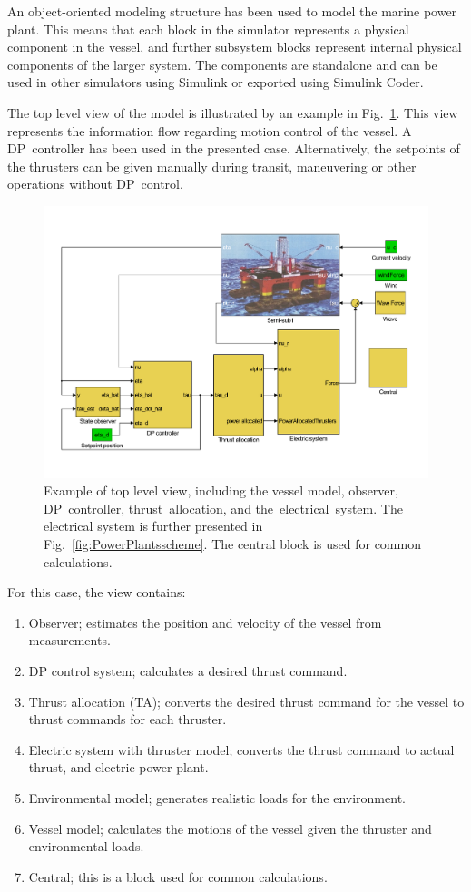 \documentclass[journal]{IEEEtran}
\begin{document}
An object-oriented modeling structure has been used to model the marine power plant.
This means that each block in the simulator represents a physical component in the vessel, and further subsystem blocks represent internal physical components of the larger system.
The components are standalone and can be used in other simulators using Simulink or exported using Simulink Coder.

The top level view of the model is illustrated by an example in Fig.~\ref{fig:DPscheme}.
This view represents the information flow regarding motion control of the vessel.
A DP~controller has been used in the presented case.
Alternatively, the setpoints of the thrusters can be given manually during transit, maneuvering or other operations without DP~control.
\begin{figure}[t!]
\normalsize
\centering
\includegraphics[trim=30 60 30 60,width=.7\textwidth,clip]{./figures/DPscheme}
\caption{Example of top level view, including the vessel model, observer, DP~controller, thrust~allocation, and the~electrical~system.
The electrical system is further presented in Fig.~\ref{fig:PowerPlantsscheme}.
The central block is used for common calculations.}
\label{fig:DPscheme}
\end{figure}

For this case, the view contains:\begin{enumerate}
\item Observer; estimates the position and velocity of the vessel from measurements.
\item DP control system; calculates a desired thrust command.
\item Thrust allocation (TA); converts the desired thrust command for the vessel to thrust commands for each thruster.
\item Electric system with thruster model; converts the thrust command to actual thrust, and electric power plant.
\item Environmental model; generates realistic loads for the environment.
\item Vessel model; calculates the motions of the vessel given the thruster and environmental loads.
\item Central; this is a block used for common calculations.
\end{enumerate} 
\end{document}
